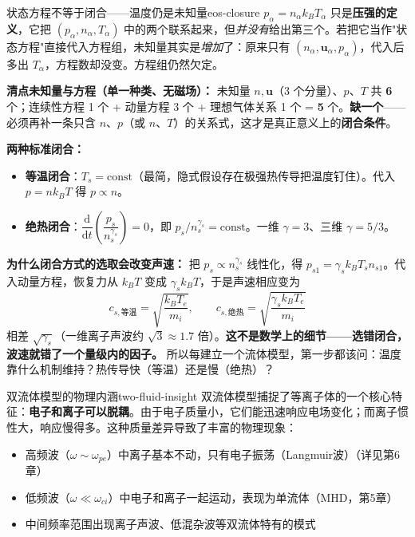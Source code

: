 \documentclass[12pt,a4paper,openany,oneside]{book}
\newcommand{\diff}{\mathrm{d}}
\newcommand{\vect}[1]{\bm{#1}}
\begin{document}
\begin{warning}{状态方程不等于闭合——温度仍是未知量}{eos-closure}
$p_\alpha=n_\alpha k_BT_\alpha$ 只是\textbf{压强的定义}，它把 $(p_\alpha,n_\alpha,T_\alpha)$ 中的两个联系起来，但\emph{并没有}给出第三个。若把它当作"状态方程"直接代入方程组，未知量其实是\emph{增加}了：原来只有 $(n_\alpha,\vect{u}_\alpha,p_\alpha)$，代入后多出 $T_\alpha$，方程数却没变。方程组仍然欠定。

\textbf{清点未知量与方程（单一种类、无磁场）：} 未知量 $n,\vect{u}$（3 个分量）、$p$、$T$ 共 \textbf{6} 个；连续性方程 1 个 + 动量方程 3 个 + 理想气体关系 1 个 = \textbf{5} 个。\textbf{缺一个}——必须再补一条只含 $n$、$p$（或 $n$、$T$）的关系式，这才是真正意义上的\textbf{闭合条件}。

\textbf{两种标准闭合：}
\begin{itemize}
\item \textbf{等温闭合}：$T_s=\mathrm{const}$（最简，隐式假设存在极强热传导把温度钉住）。代入 $p= nk_BT$ 得 $p\propto n$。
\item \textbf{绝热闭合}：$\dfrac{\diff}{\diff t}\!\left(\dfrac{p_s}{n_s^{\gamma_s}}\right)=0$，即 $p_s/n_s^{\gamma_s}=\mathrm{const}$。一维 $\gamma=3$、三维 $\gamma=5/3$。
\end{itemize}

\textbf{为什么闭合方式的选取会改变声速：} 把 $p_s\propto n_s^{\gamma_s}$ 线性化，得 $p_{s1}=\gamma_s k_BT_s n_{s1}$。代入动量方程，恢复力从 $k_BT$ 变成 $\gamma_sk_BT$，于是声速相应变为
\[
c_{s,\text{等温}}=\sqrt{\frac{k_BT_e}{m_i}}, \qquad
c_{s,\text{绝热}}=\sqrt{\frac{\gamma_sk_BT_e}{m_i}}
\]
相差 $\sqrt{\gamma_s}$（一维离子声波约 $\sqrt3\approx1.7$ 倍）。\textbf{这不是数学上的细节——选错闭合，波速就错了一个量级内的因子。} 所以每建立一个流体模型，第一步都该问：温度靠什么机制维持？热传导快（等温）还是慢（绝热）？
\end{warning}

\begin{insight}{双流体模型的物理内涵}{two-fluid-insight}
双流体模型捕捉了等离子体的一个核心特征：\textbf{电子和离子可以脱耦}。由于电子质量小，它们能迅速响应电场变化；而离子惯性大，响应慢得多。这种质量差异导致了丰富的物理现象：
\begin{itemize}
\item 高频波（$\omega \sim \omega_{pe}$）中离子基本不动，只有电子振荡（Langmuir波）（详见第6章）
\item 低频波（$\omega \ll \omega_{ci}$）中电子和离子一起运动，表现为单流体（MHD，第5章）
\item 中间频率范围出现离子声波、低混杂波等双流体特有的模式
\end{itemize}
\end{insight}
\end{document}
